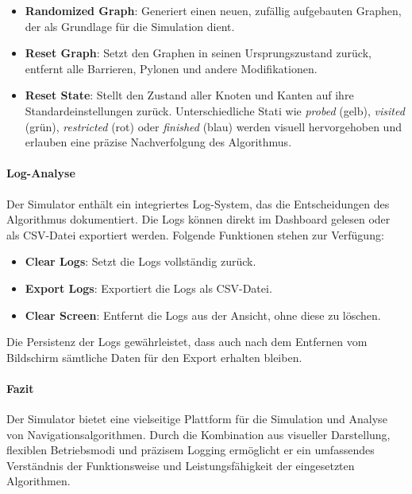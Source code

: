 \documentclass[main.tex]{subfiles} %
\begin{document}
\begin{itemize}
    \item \textbf{Randomized Graph}:  
    Generiert einen neuen, zufällig aufgebauten Graphen, der als Grundlage für die Simulation dient.

    \item \textbf{Reset Graph}:  
    Setzt den Graphen in seinen Ursprungszustand zurück, entfernt alle Barrieren, Pylonen und andere Modifikationen.

    \item \textbf{Reset State}:  
    Stellt den Zustand aller Knoten und Kanten auf ihre Standardeinstellungen zurück. Unterschiedliche Stati wie \emph{probed} (gelb), \emph{visited} (grün), \emph{restricted} (rot) oder \emph{finished} (blau) werden visuell hervorgehoben und erlauben eine präzise Nachverfolgung des Algorithmus.
\end{itemize}

\paragraph{Log-Analyse}

Der Simulator enthält ein integriertes Log-System, das die Entscheidungen des Algorithmus dokumentiert. Die Logs können direkt im Dashboard gelesen oder als CSV-Datei exportiert werden. Folgende Funktionen stehen zur Verfügung:

\begin{itemize}
    \item \textbf{Clear Logs}:  
    Setzt die Logs vollständig zurück.

    \item \textbf{Export Logs}:  
    Exportiert die Logs als CSV-Datei.

    \item \textbf{Clear Screen}:  
    Entfernt die Logs aus der Ansicht, ohne diese zu löschen.
\end{itemize}

Die Persistenz der Logs gewährleistet, dass auch nach dem Entfernen vom Bildschirm sämtliche Daten für den Export erhalten bleiben.

\paragraph{Fazit}

Der Simulator bietet eine vielseitige Plattform für die Simulation und Analyse von Navigationsalgorithmen. Durch die Kombination aus visueller Darstellung, flexiblen Betriebsmodi und präzisem Logging ermöglicht er ein umfassendes Verständnis der Funktionsweise und Leistungsfähigkeit der eingesetzten Algorithmen.
\end{document}
